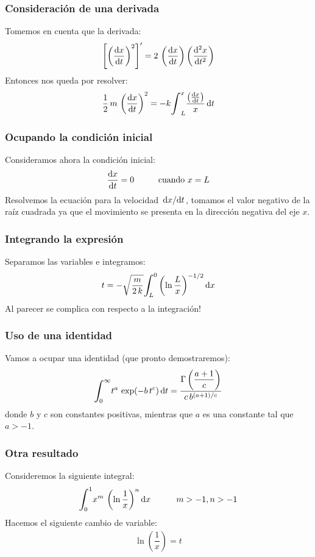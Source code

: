 \documentclass[12pt]{beamer}
\begin{document}
\begin{frame}
\frametitle{Consideración de una derivada}
Tomemos en cuenta que la derivada:
\pause
\begin{align*}
\left[ \left( \dv{x}{t} \right)^{2} \right]^{\prime} = 2 \, \left( \dv{x}{t} \right) \left( \dv[2]{x}{t} \right)
\end{align*}
\pause
Entonces nos queda por resolver:
\pause
\begin{align*}
\dfrac{1}{2} \, m \, \left( \dv{x}{t} \right)^{2} = - k \scaleint{6ex}_{L}^{x} \dfrac{\left( \dv{x}{t} \right)}{x} \dd{t}
\end{align*}
\end{frame}
\begin{frame}
\frametitle{Ocupando la condición inicial}
Consideramos ahora la condición inicial:
\pause
\begin{align*}
\dv{x}{t} = 0 \hspace{1cm} \mbox{cuando } x = L
\end{align*}
\pause
Resolvemos la ecuación para la velocidad $\dv*{x}{t}$, tomamos el valor negativo de la raíz cuadrada ya que el movimiento se presenta en la dirección negativa del eje $x$.
\end{frame}
\begin{frame}
\frametitle{Integrando la expresión}
Separamos las variables e integramos:
\pause
\begin{align*}
t = - \sqrt{\dfrac{m}{2 \, k}} \scaleint{6ex}_{\bs L}^{0} \left( \ln \dfrac{L}{x} \right)^{-1/2} \dd{x}
\end{align*}
\pause
Al parecer se complica con respecto a la integración!
\end{frame}
\begin{frame}
\frametitle{Uso de una identidad}
Vamos a ocupar una identidad (que pronto demostraremos):
\begin{align}
\scaleint{6ex}_{\bs 0}^{\infty} t^{a} \, \exp(-b \, t^{c}) \dd{t} = \dfrac{\Gamma \left( \dfrac{a + 1}{c} \right)}{c \, b^{(a+1)/c}}
\label{eq:identidad_Gamma}
\end{align}
donde $b$ y $c$ son constantes positivas, mientras que $a$ es una constante tal que $a > - 1$.
\end{frame}
\begin{frame}
\frametitle{Otra resultado}
Consideremos la siguiente integral:
\pause
\begin{align*}
\scaleint{6ex}_{\bs 0}^{1} x^{m} \, \left( \ln \dfrac{1}{x} \right)^{n} \dd{x} \hspace{1cm} m > -1, n > -1
\end{align*}
\pause
Hacemos el siguiente cambio de variable:
\begin{align*}
\ln \left(\dfrac{1}{x} \right) = t
\end{align*}
\end{frame}
\end{document}
